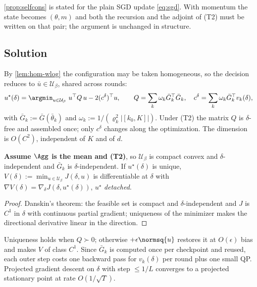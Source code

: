 \begin{remark}[Momentum]
\label{rem:momentum}
\cref{prop:selfcons} is stated for the plain SGD update \cref{eq:sgd}. With momentum the state becomes $(\theta,m)$ and both the recursion and the adjoint of (T2) must be written on that pair; the argument is unchanged in structure.
\end{remark}


\subsection{Solution}
\label{sec:solution}

By \cref{lem:hom-wlog} the configuration may be taken homogeneous, so the decision reduces to $\bar u\in\mathcal{U}_\beta$, shared across rounds:
\begin{equation}
u^{\star}(\delta)=\argmin_{u\in\mathcal{U}_\beta}\ u^{\top}Q\,u-2(c^{\delta})^{\top}u,
\qquad
Q=\sum_k\omega_k\bar G_k^{\top}\bar G_k,
\quad
c^{\delta}=\sum_k\omega_k\bar G_k^{\top}v_k(\delta),
\label{eq:qp}
\end{equation}
with $\bar G_k:=\bar G(\bar\theta_k)$ and $\omega_k:=1/(\varrho_k^2|[k_0,K]|)$. Under (T2) the matrix $Q$ is $\delta$-free and assembled once; only $c^\delta$ changes along the optimization. The dimension is $O(C^2)$, independent of $K$ and of $d$.

\begin{proposition}[Hypergradient]
\label{prop:danskin}
\textbf{Assume $\Agg$ is the mean and (T2)}, so $\mathcal{U}_\beta$ is compact convex and $\delta$-independent and $\bar G_k$ is $\delta$-independent. If $u^\star(\delta)$ is unique, $V(\delta):=\min_{u\in\mathcal{U}_\beta}J(\delta,u)$ is differentiable at $\delta$ with $\nabla V(\delta)=\nabla_\delta J(\delta,u^\star(\delta))$, $u^\star$ \emph{detached}.
\end{proposition}
\begin{proof}
Danskin's theorem: the feasible set is compact and $\delta$-independent and $J$ is $C^1$ in $\delta$ with continuous partial gradient; uniqueness of the minimizer makes the directional derivative linear in the direction.
\end{proof}

Uniqueness holds when $Q\succ0$; otherwise $+\epsilon\normsq{u}$ restores it at $O(\epsilon)$ bias and makes $V$ of class $C^1$. Since $\bar G_k$ is computed once per checkpoint and reused, each outer step costs one backward pass for $v_k(\delta)$ per round plus one small QP. Projected gradient descent on $\delta$ with step $\le1/L$ converges to a projected stationary point at rate $O(1/\sqrt T)$.